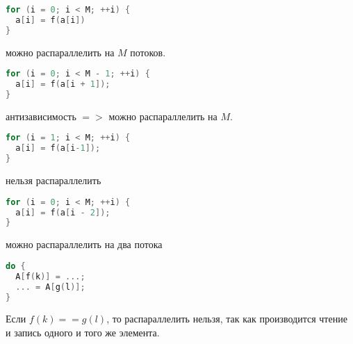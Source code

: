 \begin{frame}[fragile]

\begin{lstlisting}[language=C,basicstyle=\ttfamily,keywordstyle=\color{blue},basicstyle=\scriptsize]
for (i = 0; i < M; ++i) {
  a[i] = f(a[i])
}
\end{lstlisting}

можно распараллелить на $M$ потоков.

\end{frame}

\begin{frame}[fragile]

\begin{lstlisting}[language=C,basicstyle=\ttfamily,keywordstyle=\color{blue},basicstyle=\scriptsize]
for (i = 0; i < M - 1; ++i) {
  a[i] = f(a[i + 1]);
}
\end{lstlisting}

антизависимость $=>$ можно распараллелить на $M$.

\end{frame}

\begin{frame}[fragile]

\begin{lstlisting}[language=C,basicstyle=\ttfamily,keywordstyle=\color{blue},basicstyle=\scriptsize]
for (i = 1; i < M; ++i) {
  a[i] = f(a[i-1]);
}
\end{lstlisting}

нельзя распараллелить

\end{frame}

\begin{frame}[fragile]

\begin{lstlisting}[language=C,basicstyle=\ttfamily,keywordstyle=\color{blue},basicstyle=\scriptsize]
for (i = 0; i < M; ++i) {
  a[i] = f(a[i - 2]);
}
\end{lstlisting}

можно распараллелить на два потока

\end{frame}

\begin{frame}[fragile]

\begin{lstlisting}[language=C,basicstyle=\ttfamily,keywordstyle=\color{blue},basicstyle=\scriptsize]
do {
  A[f(k)] = ...;
  ... = A[g(l)];
}
\end{lstlisting}

Если $f(k) == g(l)$, то распараллелить нельзя, так как производится чтение и запись одного и того же элемента.

\end{frame}

